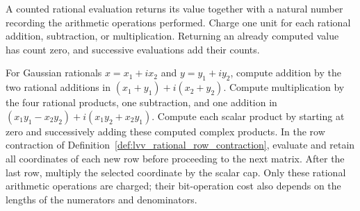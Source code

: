 \begin{definition}
    \label{def:lvv_rational_contraction_count}
    \leanok
    A counted rational evaluation returns its value together with a
    natural number recording the arithmetic operations performed.
    Charge one unit for each rational addition, subtraction, or
    multiplication. Returning an already computed value has count zero,
    and successive evaluations add their counts.

    For Gaussian rationals $x=x_1+ix_2$ and $y=y_1+iy_2$, compute
    addition by the two rational additions in
    $(x_1+y_1)+i(x_2+y_2)$. Compute multiplication by the four rational
    products, one subtraction, and one addition in
    $(x_1y_1-x_2y_2)+i(x_1y_2+x_2y_1)$.
    Compute each scalar product by starting at zero and successively
    adding these computed complex products.
    In the row contraction of Definition~\ref{def:lvv_rational_row_contraction},
    evaluate and retain all coordinates of each new row before proceeding
    to the next matrix. After the last row, multiply the selected
    coordinate by the scalar cap.
    Only these rational arithmetic operations are charged; their
    bit-operation cost also depends on the lengths of the numerators
    and denominators.
\end{definition}

